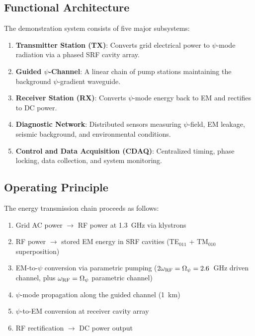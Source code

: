 \documentclass[11pt,letterpaper]{article}
\begin{document}
\subsection{Functional Architecture}

The demonstration system consists of five major subsystems:

\begin{enumerate}
\item \textbf{Transmitter Station (TX)}: Converts grid electrical power
to $\psi$-mode radiation via a phased SRF cavity array.
\item \textbf{Guided $\psi$-Channel}: A linear chain of pump stations
maintaining the background $\psi$-gradient waveguide.
\item \textbf{Receiver Station (RX)}: Converts $\psi$-mode energy back
to EM and rectifies to DC power.
\item \textbf{Diagnostic Network}: Distributed sensors measuring
$\psi$-field, EM leakage, seismic background, and environmental conditions.
\item \textbf{Control and Data Acquisition (CDAQ)}: Centralized timing,
phase locking, data collection, and system monitoring.
\end{enumerate}

\subsection{Operating Principle}

The energy transmission chain proceeds as follows:

\begin{enumerate}
\item Grid AC power $\rightarrow$ RF power at 1.3~GHz via klystrons
\item RF power $\rightarrow$ stored EM energy in SRF cavities
(TE$_{011}$ + TM$_{010}$ superposition)
\item EM-to-$\psi$ conversion via parametric pumping ($2\omega_{\rm RF}
= \Omega_\psi = 2.6$~GHz driven channel, plus $\omega_{\rm RF} =
\Omega_\psi$ parametric channel)
\item $\psi$-mode propagation along the guided channel (1~km)
\item $\psi$-to-EM conversion at receiver cavity array
\item RF rectification $\rightarrow$ DC power output
\end{enumerate}

\end{document}
